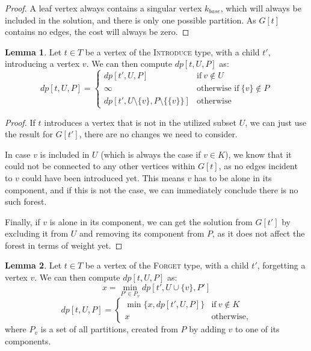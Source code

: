 \documentclass[thesis=M,english,hidelinks]{FITthesis}[2012/10/20]
\theoremstyle{definition}
\newtheorem{lemma}{Lemma}
\begin{document}
\begin{proof}
    A leaf vertex always contains a singular vertex $k_{base}$, which will always be included in the solution, and there
    is only one possible partition. As $G[t]$ contains no edges, the cost will always be zero.
\end{proof}

\begin{lemma}
    Let $t \in T$ be a vertex of the \textsc{Introduce} type, with a child $t'$, introducing a vertex $v$. We can then
    compute $dp[t, U, P]$ as:
    $$
    dp[t, U, P] =
    \begin{cases}
        dp[t', U, P] & \text{if}\ v \notin U \\
        \infty & \text{otherwise if}\ \{v\} \notin P \\
        dp[t', U \setminus \{v\}, P \setminus \{\{v\}\}] & \text{otherwise}
    \end{cases}
    $$
\end{lemma}

\begin{proof}
    If $t$ introduces a vertex that is not in the utilized subset $U$, we can just use the result for $G[t']$, there are
    no changes we need to consider.
    
    In case $v$ is included in $U$ (which is always the case if $v \in K$), we know that it could not be connected to
    any other vertices within $G[t]$, as no edges incident to $v$ could have been introduced yet. This means $v$ has
    to be alone in its component, and if this is not the case, we can immediately conclude there is no such forest.

    Finally, if $v$ is alone in its component, we can get the solution from $G[t']$ by excluding it from $U$ and
    removing its component from $P$, as it does not affect the forest in terms of weight yet.
\end{proof}

\begin{lemma}
    \label{lemma:forget}
    Let $t \in T$ be a vertex of the \textsc{Forget} type, with a child $t'$, forgetting a vertex $v$. We can then
    compute $dp[t, U, P]$ as:
    $$
    x = \min_{P' \in P_v} dp[t', U \cup \{v\}, P']
    $$
    $$
    dp[t, U, P] = 
    \begin{cases}
        \min \{x, dp[t', U, P]\}
            & \text{if}\ v \notin K \\
        x & \text{otherwise,}
    \end{cases}
    $$
    where $P_v$ is a set of all partitions, created from $P$ by adding $v$ to one of its components.
\end{lemma}
\end{document}

